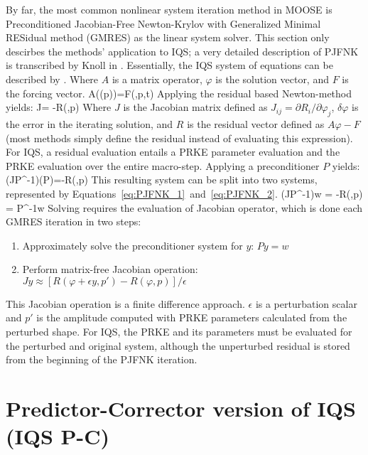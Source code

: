 By far, the most common nonlinear system iteration method in MOOSE is Preconditioned Jacobian-Free Newton-Krylov with Generalized Minimal RESidual method (GMRES) as the linear system solver.  This section only descirbes the methods' application to IQS; a very detailed description of PJFNK is transcribed by Knoll in \cite{PJFNK_Knoll}. Essentially, the IQS system of equations can be described by .  Where $A$ is a matrix operator, $\varphi$ is the solution vector, and $F$ is the forcing vector.
\be
A(\varphi(p))\varphi=F(\varphi,p,t)
\label{eq:IQSsys}
\ee
Applying the residual based Newton-method yields:
\be
J\delta\varphi = -R(\varphi,p)
\ee 
Where $J$ is the Jacobian matrix defined as $J_{ij}=\partial R_i/\partial\varphi_j$, $\delta\varphi$ is the error in the iterating solution, and $R$ is the residual vector defined as $A\varphi-F$ (most methods simply define the residual instead of evaluating this expression).  For IQS, a residual evaluation entails a PRKE parameter evaluation and the PRKE evaluation over the entire macro-step.  Applying a preconditioner $P$ yields:
\be 
(JP^{-1})(P\delta\varphi)=-R(\varphi,p)
\ee
This resulting system can be split into two systems, represented by Equations~\eqref{eq:PJFNK_1}~and~\eqref{eq:PJFNK_2}.
\be 
(JP^{-1})w = -R(\varphi,p)
\label{eq:PJFNK_1}
\ee
\be 
\delta\varphi = P^{-1}w
\label{eq:PJFNK_2}
\ee
Solving  requires the evaluation of Jacobian operator, which is done each GMRES iteration in two steps:
\begin{enumerate}
\item Approximately solve the preconditioner system for $y$: $Py=w$
\item Perform matrix-free Jacobian operation: $Jy\approx[R(\varphi+\epsilon y,p')-R(\varphi,p)]/\epsilon$
\end{enumerate}
This Jacobian operation is a finite difference approach.  $\epsilon$ is a perturbation scalar and $p'$ is the amplitude computed with PRKE parameters calculated from the perturbed shape.  For IQS, the PRKE and its parameters must be evaluated for the perturbed and original system, although the unperturbed residual is stored from the beginning of the PJFNK iteration.

\section{Predictor-Corrector version of IQS (IQS P-C)}
\label{sect:pc}

